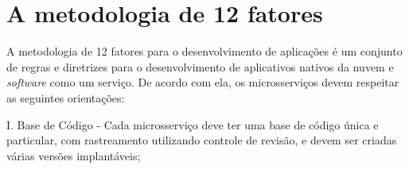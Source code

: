 \section{A metodologia de 12 fatores}

A metodologia de 12 fatores para o desenvolvimento de aplicações é um conjunto de regras e diretrizes para o desenvolvimento de aplicativos nativos da nuvem e \emph{software} como um serviço. De acordo com ela, os microsserviços devem respeitar as seguintes orientações: \cite{12factor, oracle_microservices,12fatores-rita}









I. Base de Código - Cada microsserviço deve ter uma base de código única e particular, com rastreamento utilizando controle de revisão, e devem ser criadas várias versões implantáveis;

